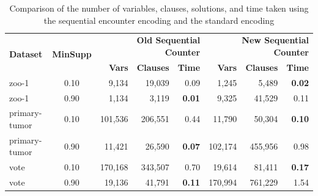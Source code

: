 \begin{table}[H]
    \centering
    \caption{Comparison of the number of variables, clauses, solutions, and time taken using the sequential encounter encoding and the standard encoding}
    \label{tab:result_benchmark_real_datasets}
    \begin{tabular}{|l|c|r|r|r|r|r|r|}
        \hline
        \multirow{2}{*}{\textbf{Dataset}} & \multirow{2}{*}{\textbf{MinSupp}} & \multicolumn{3}{r|}{\textbf{Old Sequential Counter}} & \multicolumn{3}{r|}{\textbf{New Sequential Counter}}                                                                        \\ \cline{3-8}
                                          &                                   & \textbf{Vars}                                        & \textbf{Clauses}                                     & \textbf{Time}   & \textbf{Vars} & \textbf{Clauses} & \textbf{Time}   \\ \hline
        zoo-1                             & 0.10                              & 9,134                                                & 19,039                                               & 0.09            & 1,245         & 5,489            & \textbf{0.02}   \\ \hline
        zoo-1                             & 0.90                              & 1,134                                                & 3,119                                                & \textbf{0.01}   & 9,325         & 41,529           & 0.11            \\ \hline
        primary-tumor                     & 0.10                              & 101,536                                              & 206,551                                              & 0.44            & 11,790        & 50,304           & \textbf{0.10}   \\ \hline
        primary-tumor                     & 0.90                              & 11,421                                               & 26,590                                               & \textbf{0.07}   & 102,174       & 455,956          & 0.98            \\ \hline
        vote                              & 0.10                              & 170,168                                              & 343,507                                              & 0.70            & 19,614        & 81,411           & \textbf{0.17}   \\ \hline
        vote                              & 0.90                              & 19,136                                               & 41,791                                               & \textbf{0.11}   & 170,994       & 761,229          & 1.54            \\ \hline

\end{tabular}
\end{table}
